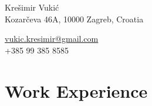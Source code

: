 \documentclass[a4paper,10pt]{article} %
\begin{document}
  
  \pagestyle{empty} %
  
  
  
  \begin{minipage}{.5\textwidth}
  \LARGE{Krešimir Vukić}\\
  \normalsize{Kozarčeva 46A, 10000 Zagreb, Croatia}
  \end{minipage}%
  \begin{minipage}{.5\textwidth}
  \raggedleft
  \href{mailto:vukic.kresimir@gmail.com}{vukic.kresimir@gmail.com} \\
  +385 99 385 8585 \\
  \end{minipage}
  
  \vspace{5mm}
  
  
  
  \section{Work Experience}
  
\end{document}
